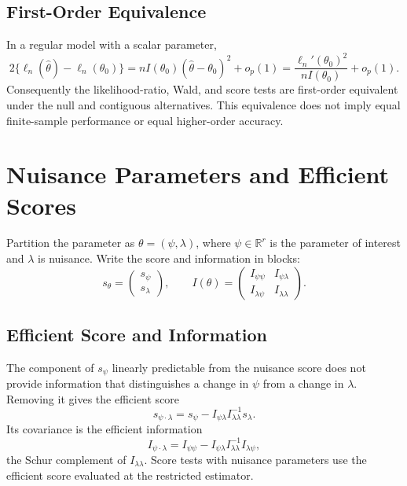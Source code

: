 \documentclass[12pt,oneside]{book}
\numberwithin{equation}{section}
\theoremstyle{definition}
\theoremstyle{plain}
\theoremstyle{remark}
\newcommand{\R}{\mathbb{R}}
\begin{document}
\subsection{First-Order Equivalence}

In a regular model with a scalar parameter,
\[
 2\{\ell_n(\widehat\theta)-\ell_n(\theta_0)\}
 =nI(\theta_0)(\widehat\theta-\theta_0)^2+o_p(1)
 =\frac{\ell_n'(\theta_0)^2}{nI(\theta_0)}+o_p(1).
\]
Consequently the likelihood-ratio, Wald, and score tests are first-order
equivalent under the null and contiguous alternatives.  This equivalence does
not imply equal finite-sample performance or equal higher-order accuracy.

\section{Nuisance Parameters and Efficient Scores}

Partition the parameter as $\theta=(\psi,\lambda)$, where
$\psi\in\R^r$ is the parameter of interest and $\lambda$ is nuisance.  Write
the score and information in blocks:
\[
 s_\theta=
 \begin{pmatrix}s_\psi\\s_\lambda\end{pmatrix},
 \qquad
 I(\theta)=
 \begin{pmatrix}
 I_{\psi\psi}&I_{\psi\lambda}\\
 I_{\lambda\psi}&I_{\lambda\lambda}
 \end{pmatrix}.
\]

\subsection{Efficient Score and Information}

The component of $s_\psi$ linearly predictable from the nuisance score does
not provide information that distinguishes a change in $\psi$ from a change
in $\lambda$.  Removing it gives the efficient score
\begin{equation}
    s_{\psi\cdot\lambda}
    =s_\psi-I_{\psi\lambda}I_{\lambda\lambda}^{-1}s_\lambda.
    \label{eq:efficient-score}
\end{equation}
Its covariance is the efficient information
\begin{equation}
    I_{\psi\cdot\lambda}
    =I_{\psi\psi}
     -I_{\psi\lambda}I_{\lambda\lambda}^{-1}I_{\lambda\psi},
    \label{eq:efficient-information}
\end{equation}
the Schur complement of $I_{\lambda\lambda}$.  Score tests with nuisance
parameters use the efficient score evaluated at the restricted estimator.
\end{document}
